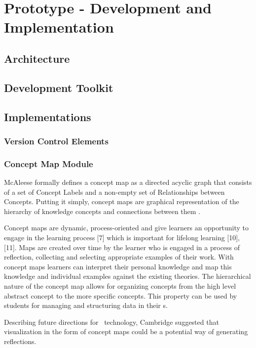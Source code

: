 \chapter{Prototype - Development and Implementation\label{cha:prototype}}

\section{Architecture}

\section{Development Toolkit}

\section{Implementations}

\subsection{Version Control Elements}

\subsection{Concept Map Module}
McAleese \citeyearpar{Mcaleese1998} formally defines a concept map as a directed
acyclic graph that consists of a set of Concept Labels and a non-empty set of
Relationships between Concepts. Putting it simply, concept maps are graphical
representation of the hierarchy of knowledge concepts and connections between
them \citep{Novak2008}.

Concept maps are dynamic, process-oriented and give learners an opportunity to
engage in the learning process [7] which is important for lifelong learning
[10], [11]. Maps are created over time by the learner who is engaged in a
process of reflection, collecting and selecting appropriate examples of their
work. With concept maps learners can interpret their personal knowledge and map
this knowledge and individual examples against the existing theories. The
hierarchical nature of the concept map allows for organizing concepts from the
high level abstract concept to the more specific concepts. This property can be
used by students for managing and structuring data in their \ep s.



Describing future directions for \ep~technology, Cambridge
\citeyearpar{Cambridge2010} suggested that visualization in the form of concept
maps could be a potential way of generating reflections.
 

